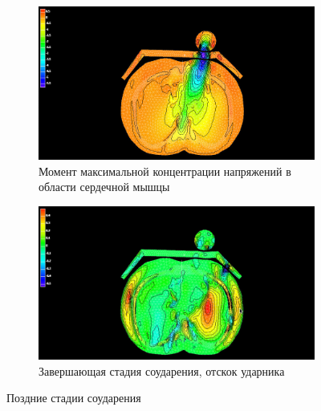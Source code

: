 \begin{figure}[h]
\centering
\begin{subfigure}[b]{0.9\textwidth}
\centering
\includegraphics[width=\textwidth]{png/cranium/chest-res-06.png}
\caption{Момент максимальной концентрации напряжений в области сердечной мышцы}
\end{subfigure}
\begin{subfigure}[b]{0.9\textwidth}
\centering
\includegraphics[width=\textwidth]{png/cranium/chest-res-07.png}
\caption{Завершающая стадия соударения, отскок ударника}
\end{subfigure}
\caption{Поздние стадии соударения}
\end{figure}

